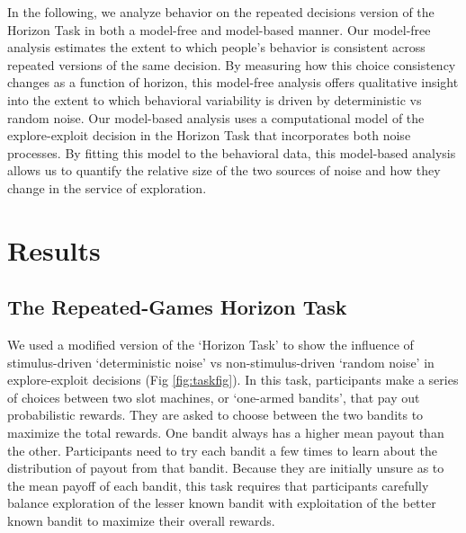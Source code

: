 \documentclass[12pt]{article}
\begin{document}
{	In the following, we analyze behavior on the repeated decisions version of the Horizon Task in both a model-free and model-based manner. Our model-free analysis estimates the extent to which people's behavior is consistent across repeated versions of the same decision. By measuring how this choice consistency changes as a function of horizon, this model-free analysis offers qualitative insight into the extent to which behavioral variability is driven by deterministic vs random noise. Our model-based analysis uses a computational model of the explore-exploit decision in the Horizon Task that incorporates both noise processes. By fitting this model to the behavioral data, this model-based analysis allows us to quantify the relative size of the two sources of noise and how they change in the service of exploration.
		
	\section*{Results}	
	\subsection*{The Repeated-Games Horizon Task}
	We used a modified version of the `Horizon Task' \citep{wilson2014} to show the influence of stimulus-driven `deterministic noise' vs non-stimulus-driven `random noise' in explore-exploit decisions (Fig  \ref{fig:taskfig}). In this task, participants make a series of choices between two slot machines, or `one-armed bandits', that pay out probabilistic rewards. They are asked to choose between the two bandits to maximize the total rewards. One bandit always has a higher mean payout than the other. Participants need to try each bandit a few times to learn about the distribution of payout from that bandit. Because they are initially unsure as to the mean payoff of each bandit, this task requires that participants carefully balance exploration of the lesser known bandit with exploitation of the better known bandit to maximize their overall rewards. 
	
}
\end{document}
